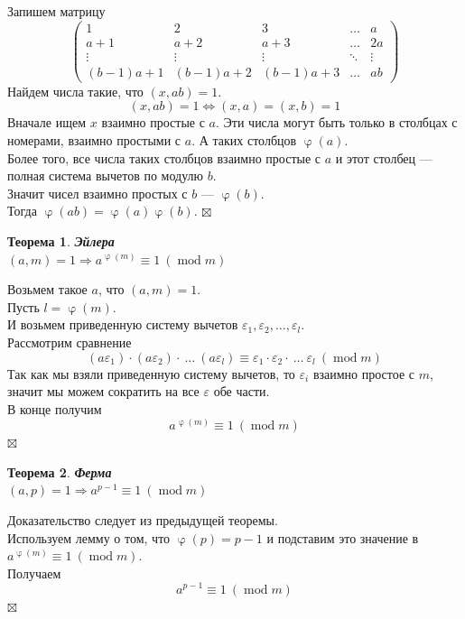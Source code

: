 \documentclass[a4paper, 12pt]{article}
\newtheorem*{theorem}{Теорема}
\newenvironment{Proof}
{\par\noindent{$\blacklozenge$}}
{\hfill$\scriptstyle\boxtimes$}
\renewcommand{\mod}{\operatorname{mod}}
\renewcommand{\varphi}{\upvarphi}
\begin{document}
    \begin{Proof}
    Запишем матрицу
    $$\begin{pmatrix}
    1 & 2 & 3 & \dots & a\\
    a+1 & a+2 & a+3 & \dots & 2a\\
    \vdots & \vdots & \vdots & \ddots & \vdots\\
    (b-1)a+1 & (b-1)a+2 & (b-1)a+3 & \dots & ab
    \end{pmatrix}$$
    Найдем числа такие, что $(x,ab)=1$.
    $$(x,ab)=1 \Leftrightarrow (x,a)=(x,b)=1$$
    Вначале ищем $x$ взаимно простые с $a$. Эти числа могут быть только в столбцах с номерами, взаимно простыми с $a$. А таких столбцов $\varphi(a)$.\\
    Более того, все числа таких столбцов взаимно простые с $a$ и этот столбец --- полная система вычетов по модулю $b$.\\
    Значит чисел взаимно простых с $b$ --- $\varphi(b)$.\\
    Тогда $\varphi(ab)=\varphi(a)\varphi(b)$.
    \end{Proof}
    \begin{theorem}
        \textbf{Эйлера}\\
        $(a,m)=1 \Rightarrow a^{\varphi(m)} \equiv 1 \ (\mod m)$
    \end{theorem}
    \begin{Proof}
    Возьмем такое $a$, что $(a,m)=1$.\\
    Пусть $l=\varphi(m)$.\\
    И возьмем приведенную систему вычетов $\varepsilon_1,\varepsilon_2,\dots,\varepsilon_l$.\\
    Рассмотрим сравнение $$(a\varepsilon_1)\cdot(a\varepsilon_2)\cdot \ \dots \ (a\varepsilon_l) \equiv \varepsilon_1\cdot\varepsilon_2\cdot \ \dots \ \varepsilon_l \ (\mod m)$$ 
    Так как мы взяли приведенную систему вычетов, то $\varepsilon_i$ взаимно простое с $m$, значит мы можем сократить на все $\varepsilon$ обе части.\\
    В конце получим
    $$a^{\varphi(m)} \equiv 1 \ (\mod m)$$
    \end{Proof}
    \begin{theorem}
        \textbf{Ферма}\\
        $(a,p)=1 \Rightarrow a^{p-1} \equiv 1 \ (\mod m)$
    \end{theorem}
    \begin{Proof}
    Доказательство следует из предыдущей теоремы.\\
    Используем лемму о том, что $\varphi(p)=p-1$ и подставим это значение в $a^{\varphi(m)} \equiv 1 \ (\mod m)$.\\
    Получаем
    $$a^{p-1} \equiv 1 \ (\mod m)$$
    \end{Proof}
\end{document}
